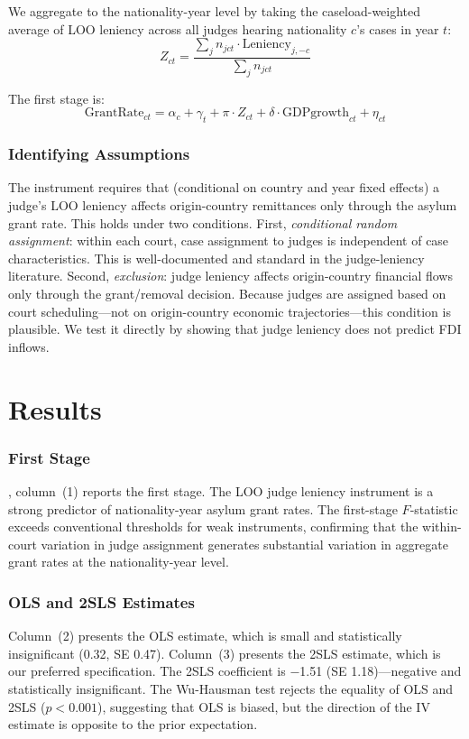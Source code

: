 \documentclass[12pt]{article}
\begin{document}
We aggregate to the nationality-year level by taking the caseload-weighted average of LOO leniency across all judges hearing nationality $c$'s cases in year $t$:
\begin{equation}
Z_{ct} = \frac{\sum_j n_{jct} \cdot \text{Leniency}_{j,-c}}{\sum_j n_{jct}}
\label{eq:instrument}
\end{equation}

The first stage is:
\begin{equation}
\text{GrantRate}_{ct} = \alpha_c + \gamma_t + \pi \cdot Z_{ct} + \delta \cdot \text{GDPgrowth}_{ct} + \eta_{ct}
\label{eq:firststage}
\end{equation}

\subsubsection*{Identifying Assumptions} The instrument requires that (conditional on country and year fixed effects) a judge's LOO leniency affects origin-country remittances only through the asylum grant rate. This holds under two conditions. First, \emph{conditional random assignment}: within each court, case assignment to judges is independent of case characteristics. This is well-documented \citep{GAO2008, GAO2017} and standard in the judge-leniency literature. Second, \emph{exclusion}: judge leniency affects origin-country financial flows only through the grant/removal decision. Because judges are assigned based on court scheduling---not on origin-country economic trajectories---this condition is plausible. We test it directly by showing that judge leniency does not predict FDI inflows.

\section{Results}

\subsubsection*{First Stage} , column~(1) reports the first stage. The LOO judge leniency instrument is a strong predictor of nationality-year asylum grant rates. The first-stage $F$-statistic exceeds conventional thresholds for weak instruments, confirming that the within-court variation in judge assignment generates substantial variation in aggregate grant rates at the nationality-year level.

\subsubsection*{OLS and 2SLS Estimates} Column~(2) presents the OLS estimate, which is small and statistically insignificant (0.32, SE 0.47). Column~(3) presents the 2SLS estimate, which is our preferred specification. The 2SLS coefficient is $-$1.51 (SE 1.18)---negative and statistically insignificant. The Wu-Hausman test rejects the equality of OLS and 2SLS ($p < 0.001$), suggesting that OLS is biased, but the direction of the IV estimate is opposite to the prior expectation.
\end{document}
